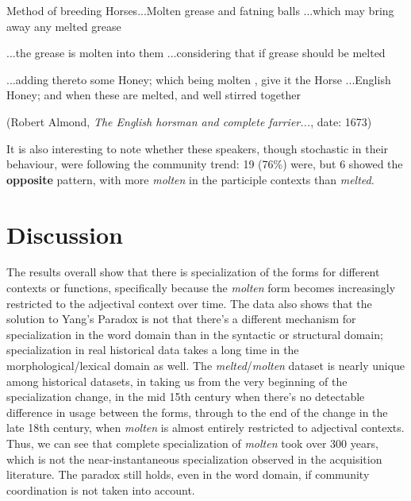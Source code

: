 \documentclass{artikel3}
\begin{document}
	\begin{exe}
	\ex \begin{xlist} \ex Method of breeding Horses...Molten grease and fatning balls
		\ex ...which may bring away any melted grease\\
	\end{xlist}
	\ex \begin{xlist} \ex ...the grease is molten into them
		\ex ...considering that if grease should be melted\\
	\end{xlist}
	\ex \begin{xlist} \ex...adding thereto some Honey; which being molten , give it the Horse
		\ex ...English Honey; and when these are melted, and well stirred together\\
	\end{xlist}
(Robert Almond, \textsl{The English horsman and complete farrier...}, date: 1673)
\end{exe}


It is also interesting to note whether these speakers, though stochastic in their behaviour, were following the community trend: 19 (76\%) were, but 6 showed the \textbf{opposite} pattern, with more \textsl{molten} in the participle contexts than \textsl{melted}.




\section{Discussion}
\label{discuss}

The results overall show that there is specialization of the forms for different contexts or functions, specifically because the \textsl{molten} form becomes increasingly restricted to the adjectival context over time. The data also shows that the solution to Yang's Paradox is not that there's a different mechanism for specialization in the word domain than in the syntactic or structural domain; specialization in real historical data takes a long time in the morphological/lexical domain as well. The \textsl{melted}/\textsl{molten} dataset is nearly unique among historical datasets, in taking us from the very beginning of the specialization change, in the mid 15th century when there's no detectable difference in usage between the forms, through to the end of the change in the late 18th century, when \textsl{molten} is almost entirely restricted to adjectival contexts. Thus, we can see that complete specialization of \textsl{molten} took over 300 years, which is not the near-instantaneous specialization observed in the acquisition literature. The paradox still holds, even in the word domain, if community coordination is not taken into account.
\end{document}
